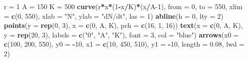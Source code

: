 \documentclass[
]{book}
\newenvironment{Shaded}{\begin{snugshade}}{\end{snugshade}}
\newcommand{\AttributeTok}[1]{\textcolor[rgb]{0.13,0.29,0.53}{#1}}
\newcommand{\DecValTok}[1]{\textcolor[rgb]{0.00,0.00,0.81}{#1}}
\newcommand{\FloatTok}[1]{\textcolor[rgb]{0.00,0.00,0.81}{#1}}
\newcommand{\FunctionTok}[1]{\textcolor[rgb]{0.13,0.29,0.53}{\textbf{#1}}}
\newcommand{\NormalTok}[1]{#1}
\newcommand{\OtherTok}[1]{\textcolor[rgb]{0.56,0.35,0.01}{#1}}
\newcommand{\SpecialCharTok}[1]{\textcolor[rgb]{0.81,0.36,0.00}{\textbf{#1}}}
\newcommand{\StringTok}[1]{\textcolor[rgb]{0.31,0.60,0.02}{#1}}
\begin{document}
\begin{Shaded}
\begin{Highlighting}[]
\NormalTok{r }\OtherTok{=} \DecValTok{1}
\NormalTok{A }\OtherTok{=} \DecValTok{150}
\NormalTok{K }\OtherTok{=} \DecValTok{500}
\FunctionTok{curve}\NormalTok{(r}\SpecialCharTok{*}\NormalTok{x}\SpecialCharTok{*}\NormalTok{(}\DecValTok{1}\SpecialCharTok{{-}}\NormalTok{x}\SpecialCharTok{/}\NormalTok{K)}\SpecialCharTok{*}\NormalTok{(x}\SpecialCharTok{/}\NormalTok{A}\DecValTok{{-}1}\NormalTok{), }\AttributeTok{from =} \DecValTok{0}\NormalTok{, }\AttributeTok{to =} \DecValTok{550}\NormalTok{, }\AttributeTok{xlim =} \FunctionTok{c}\NormalTok{(}\DecValTok{0}\NormalTok{, }\DecValTok{550}\NormalTok{),}
      \AttributeTok{xlab =} \StringTok{"N"}\NormalTok{, }\AttributeTok{ylab =} \StringTok{"dN/dt"}\NormalTok{, }\AttributeTok{las =} \DecValTok{1}\NormalTok{)}
\FunctionTok{abline}\NormalTok{(}\AttributeTok{h =} \DecValTok{0}\NormalTok{, }\AttributeTok{lty =} \DecValTok{2}\NormalTok{)}
\FunctionTok{points}\NormalTok{(}\AttributeTok{y =} \FunctionTok{rep}\NormalTok{(}\DecValTok{0}\NormalTok{, }\DecValTok{3}\NormalTok{), }\AttributeTok{x =} \FunctionTok{c}\NormalTok{(}\DecValTok{0}\NormalTok{, A, K), }\AttributeTok{pch =} \FunctionTok{c}\NormalTok{(}\DecValTok{16}\NormalTok{, }\DecValTok{1}\NormalTok{, }\DecValTok{16}\NormalTok{))}
\FunctionTok{text}\NormalTok{(}\AttributeTok{x =} \FunctionTok{c}\NormalTok{(}\DecValTok{0}\NormalTok{, A, K), }\AttributeTok{y =} \FunctionTok{rep}\NormalTok{(}\DecValTok{20}\NormalTok{, }\DecValTok{3}\NormalTok{), }\AttributeTok{labels =} \FunctionTok{c}\NormalTok{(}\StringTok{"0"}\NormalTok{, }\StringTok{"A"}\NormalTok{, }\StringTok{"K"}\NormalTok{), }\AttributeTok{font =} \DecValTok{3}\NormalTok{, }\AttributeTok{col =} \StringTok{"blue"}\NormalTok{)}
\FunctionTok{arrows}\NormalTok{(}\AttributeTok{x0 =} \FunctionTok{c}\NormalTok{(}\DecValTok{100}\NormalTok{, }\DecValTok{200}\NormalTok{, }\DecValTok{550}\NormalTok{), }\AttributeTok{y0 =} \SpecialCharTok{{-}}\DecValTok{10}\NormalTok{, }\AttributeTok{x1 =} \FunctionTok{c}\NormalTok{(}\DecValTok{10}\NormalTok{, }\DecValTok{450}\NormalTok{, }\DecValTok{510}\NormalTok{), }\AttributeTok{y1 =} \SpecialCharTok{{-}}\DecValTok{10}\NormalTok{, }\AttributeTok{length =} \FloatTok{0.08}\NormalTok{, }\AttributeTok{lwd =} \DecValTok{2}\NormalTok{)}
\end{Highlighting}
\end{Shaded}
\end{document}
